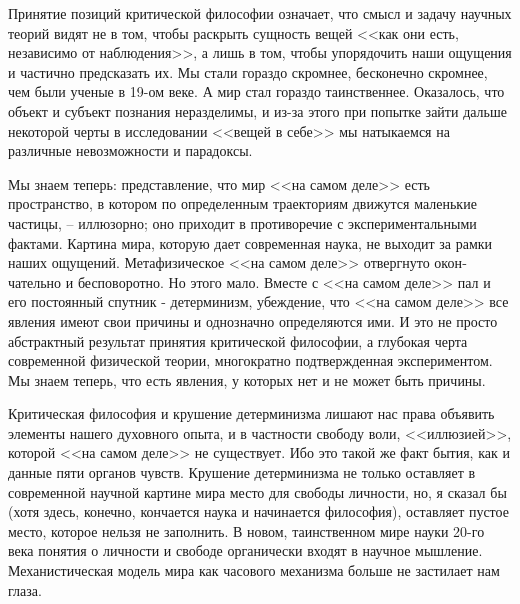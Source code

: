 \documentclass{book}
\begin{document}
Принятие позиций критической философии означает, что смысл и задачу научных теорий видят не в том, чтобы раскрыть сущность вещей <<как они есть, независимо от наблюдения>>, а лишь в том, чтобы упорядочить наши ощущения и частично предсказать их. Мы стали гораздо скромнее, бесконечно скром­нее, чем были ученые в 19-ом веке. А мир стал гораздо таинст­веннее. Оказалось, что объект и субъект познания неразделимы, и из-за этого при попытке зайти дальше некоторой черты в ис­следовании <<вещей в себе>> мы натыкаемся на различные невоз­можности и парадоксы.

Мы знаем теперь: представление, что мир <<на самом деле>> есть пространство, в котором по определенным траекториям движутся маленькие частицы, -- иллюзорно; оно приходит в противоречие с экспериментальными фактами. Картина мира, которую дает современная наука, не выходит за рамки наших ощущений. Метафизическое <<на самом деле>> отвергнуто окон­чательно и бесповоротно. Но этого мало. Вместе с <<на самом деле>> пал и его постоянный спутник - детерминизм, убежде­ние, что <<на самом деле>> все явления имеют свои причины и однозначно определяются ими. И это не просто абстрактный результат принятия критической философии, а глубокая черта современной физической теории, многократно подтвержденная экспериментом. Мы знаем теперь, что есть явления, у которых нет и не может быть причины.

Критическая философия и крушение детерминизма лишают нас права объявить элементы нашего духовного опыта, и в частности свободу воли, <<иллюзией>>, которой <<на самом деле>> не существует. Ибо это такой же факт бытия, как и данные пяти органов чувств. Крушение детерминизма не только оставляет в современной научной картине мира место для свободы личности, но, я сказал бы (хотя здесь, конечно, кончается наука и начинается философия), оставляет пустое  место, которое нельзя не заполнить.  В новом, таинственном мире науки 20-го века понятия о личности и свободе органически входят в науч­ное мышление. Механистическая модель мира как часового механизма больше не застилает нам глаза.
\end{document}
